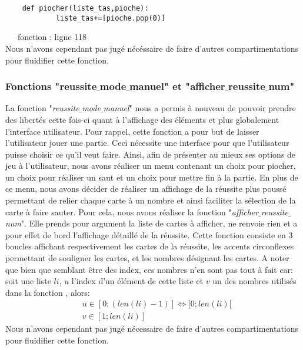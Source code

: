 \documentclass[10pt,a4paper,french,titlepage]{article}
\theoremstyle{definition}
\begin{document}
\begin{lstlisting}
	def piocher(liste_tas,pioche):
    		liste_tas+=[pioche.pop(0)]

\end{lstlisting}

~~~fonction : ligne 118\\

Nous n'avons cependant pas jugé nécéssaire de faire d'autres compartimentations pour fluidifier cette fonction.

\subsubsection{Fonctions "reussite$\_$mode$\_$manuel" et "afficher$\_$reussite$\_$num"}\label{fctreu}
La fonction "\textit{reussite$\_$mode$\_$manuel}" nous a permis à nouveau de pouvoir prendre des libertés cette fois-ci quant à l'affichage des éléments et plus globalement l'interface utilisateur. Pour rappel, cette fonction a pour but de laisser l'utilisateur jouer une partie. Ceci nécessite une interface pour que l'utilisateur puisse choisir ce qu'il veut faire. Ainsi, afin de présenter au mieux ses options de jeu à l'utilisateur, nous avons réaliser un menu contenant un choix pour piocher, un choix pour réaliser un saut et un choix pour mettre fin à la partie. En plus de ce menu, nous avons décider de réaliser un affichage de la réussite plus poussé permettant de relier chaque carte à un nombre et ainsi faciliter la sélection de la carte à faire sauter. 
Pour cela, nous avons réaliser la fonction "\textit{afficher$\_$reussite$\_$num}". Elle prends pour argument la liste de cartes à afficher, ne renvoie rien et a pour effet de bord l'affichage détaillé de la réussite. Cette fonction consiste en 3 boucles affichant respectivement les cartes de la réussite, les
accents circonflexes permettant de souligner les cartes, et les nombres désignant les cartes. A noter que bien que semblant être des index, ces nombres n'en sont pas tout à fait car: soit une liste $li$, $u$ l'index d'un élément de cette liste et $v$ un des nombres utilisés dans la fonction , alors:
\begin{align*}
	&u \in [0;(len(li)-1)] \iff [0;len(li)[\\
	&v \in [1;len(li)]
\end{align*}
Nous n'avons cependant pas jugé nécessaire de faire d'autres compartimentations pour fluidifier cette fonction.\\
\end{document}
